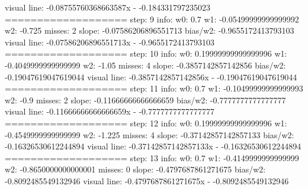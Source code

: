 \documentclass[11pt]{article}
\begin{document}
\begin{enumerate}
	visual line: -0.08755760368663587x - -0.184331797235023 \newline
=================== \newline
step: 9 info: w0: 0.7 w1: -0.05499999999999992 w2: -0.725 misses: 2 \newline
		slope: -0.07586206896551713 bias/w2: -0.9655172413793103 \newline
	visual line: -0.07586206896551713x - -0.9655172413793103 \newline
=================== \newline
step: 10 info: w0: 0.19999999999999996 w1: -0.4049999999999999 w2: -1.05 misses: 4 \newline
		slope: -0.3857142857142856 bias/w2: -0.19047619047619044 \newline
	visual line: -0.3857142857142856x - -0.19047619047619044 \newline
=================== \newline
step: 11 info: w0: 0.7 w1: -0.10499999999999993 w2: -0.9 misses: 2 \newline
		slope: -0.11666666666666659 bias/w2: -0.7777777777777777 \newline
	visual line: -0.11666666666666659x - -0.7777777777777777 \newline
=================== \newline
step: 12 info: w0: 0.19999999999999996 w1: -0.4549999999999999 w2: -1.225 misses: 4 \newline
		slope: -0.37142857142857133 bias/w2: -0.16326530612244894 \newline
	visual line: -0.37142857142857133x - -0.16326530612244894 \newline
=================== \newline
step: 13 info: w0: 0.7 w1: -0.4149999999999999 w2: -0.8650000000000001 misses: 0 \newline
		slope: -0.4797687861271675 bias/w2: -0.8092485549132946 \newline
	visual line: -0.4797687861271675x - -0.8092485549132946 \newline
\end{enumerate}
\end{document}
